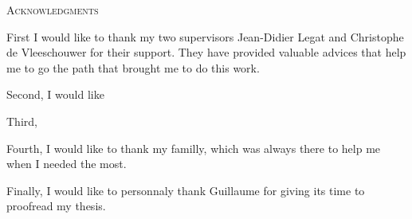 
\begin{center}
\huge{\textsc{Acknowledgments}}
\end{center}
First I would like to thank my two supervisors Jean-Didier Legat and Christophe de Vleeschouwer for their support. They have provided valuable advices that help me to go the path that brought me to do this work. 

Second, I would like 

Third,

Fourth, I would like to thank my familly, which was always there to help me when I needed the most.

Finally, I would like to personnaly thank Guillaume for giving its time to proofread my thesis.
\afterpage{\blankpage}
\newpage
